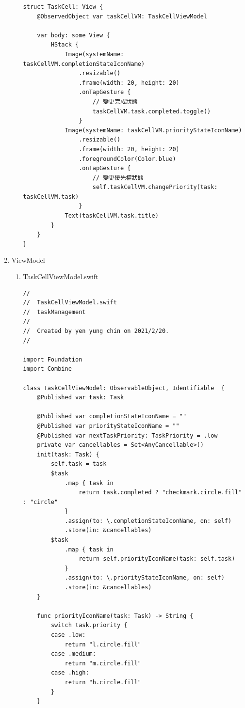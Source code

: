 \documentclass[a4paper,12pt]{article}
\begin{document}
\begin{enumerate}
\begin{enumerate}
\begin{lstlisting}
struct TaskCell: View {
    @ObservedObject var taskCellVM: TaskCellViewModel

    var body: some View {
        HStack {
            Image(systemName: taskCellVM.completionStateIconName)
                .resizable()
                .frame(width: 20, height: 20)
                .onTapGesture {
                    // 變更完成狀態
                    taskCellVM.task.completed.toggle()
                }
            Image(systemName: taskCellVM.priorityStateIconName)
                .resizable()
                .frame(width: 20, height: 20)
                .foregroundColor(Color.blue)
                .onTapGesture {
                    // 變更優先權狀態
                    self.taskCellVM.changePriority(task: taskCellVM.task)
                }
            Text(taskCellVM.task.title)
        }
    }
}
\end{lstlisting}
\end{enumerate}
\item ViewModel
\label{sec:org7d4b69c}
\begin{enumerate}
\item TaskCellViewModel.swift
\label{sec:org54dcd89}
\lstset{breaklines=true,language=swift,label= ,caption= ,captionpos=b,firstnumber=1,numbers=left}
\begin{lstlisting}
//
//  TaskCellViewModel.swift
//  taskManagement
//
//  Created by yen yung chin on 2021/2/20.
//

import Foundation
import Combine

class TaskCellViewModel: ObservableObject, Identifiable  {
    @Published var task: Task

    @Published var completionStateIconName = ""
    @Published var priorityStateIconName = ""
    @Published var nextTaskPriority: TaskPriority = .low
    private var cancellables = Set<AnyCancellable>()
    init(task: Task) {
        self.task = task
        $task
            .map { task in
                return task.completed ? "checkmark.circle.fill" : "circle"
            }
            .assign(to: \.completionStateIconName, on: self)
            .store(in: &cancellables)
        $task
            .map { task in
                return self.priorityIconName(task: self.task)
            }
            .assign(to: \.priorityStateIconName, on: self)
            .store(in: &cancellables)
    }

    func priorityIconName(task: Task) -> String {
        switch task.priority {
        case .low:
            return "l.circle.fill"
        case .medium:
            return "m.circle.fill"
        case .high:
            return "h.circle.fill"
        }
    }


\end{lstlisting}
\end{enumerate}
\end{enumerate}
\end{document}
